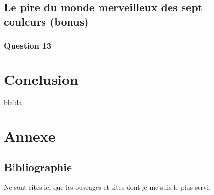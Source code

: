 \documentclass[12pt,a4paper,twoside]{article}
\begin{document}
\subsection{Le pire du monde merveilleux des sept couleurs (bonus)}
\label{sec:orgheadline24}
\subsubsection*{Question 13}
\label{sec:orgheadline23}
\section{Conclusion}
\label{sec:orgheadline26}
\label{sec:conclusion}
blabla
\clearpage\appendix

\section{Annexe}
\label{sec:orgheadline28}
\subsection{Bibliographie}
\label{sec:orgheadline27}
Ne sont cités ici que les ouvrages et sites dont je me suis le plus
servi.

\def\section*#1{}

\nocite{*}

\clearpage
\end{document}
